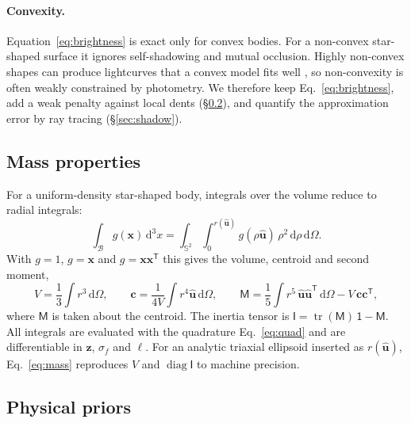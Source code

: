 \documentclass[11pt,a4paper]{article}
\theoremstyle{remark}
\newcommand{\vect}[1]{\bm{#1}}
\newcommand{\uv}[1]{\hat{\bm{#1}}}
\newcommand{\Sph}{\mathbb{S}^2}
\newcommand{\dd}{\,\mathrm{d}}
\newcommand{\T}{^{\mathsf T}}
\DeclareMathOperator{\diag}{diag}
\DeclareMathOperator{\tr}{tr}
\begin{document}
\paragraph{Convexity.} Equation~\eqref{eq:brightness} is exact only for convex bodies. For a non-convex
star-shaped surface it ignores self-shadowing and mutual occlusion. Highly non-convex shapes can produce
lightcurves that a convex model fits well \citep{durech2003}, so non-convexity is often weakly
constrained by photometry. We therefore keep Eq.~\eqref{eq:brightness}, add a weak penalty against
local dents (\S\ref{sec:physical}), and quantify the approximation error by ray tracing
(\S\ref{sec:shadow}).

\subsection{Mass properties}
\label{sec:mass}
For a uniform-density star-shaped body, integrals over the volume reduce to radial integrals:
\begin{equation}
  \int_{\mathcal B}g(\vect x)\dd^3x=\int_{\Sph}\int_0^{r(\uv u)}g(\rho\uv u)\,\rho^2\dd\rho\dd\Omega .
\end{equation}
With $g=1$, $g=\vect x$ and $g=\vect x\vect x\T$ this gives the volume, centroid and second moment,
\begin{equation}
  V=\frac13\int r^3\dd\Omega,\qquad
  \vect c=\frac{1}{4V}\int r^4\uv u\dd\Omega,\qquad
  \mathsf M=\frac15\int r^5\,\uv u\uv u\T\dd\Omega-V\,\vect c\vect c\T,
  \label{eq:mass}
\end{equation}
where $\mathsf M$ is taken about the centroid. The inertia tensor is
$\mathsf I=\tr(\mathsf M)\,\mathsf 1-\mathsf M$. All integrals are evaluated with the quadrature
Eq.~\eqref{eq:quad} and are differentiable in $\vect z$, $\sigma_f$ and $\ell$. For an analytic triaxial
ellipsoid inserted as $r(\uv u)$, Eq.~\eqref{eq:mass} reproduces $V$ and $\diag\mathsf I$ to machine
precision.

\subsection{Physical priors}
\label{sec:physical}
\end{document}

